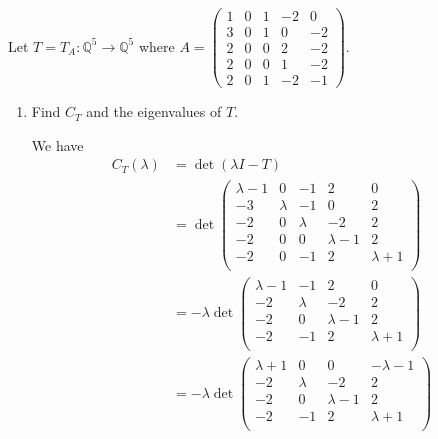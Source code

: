 \documentclass{eh-homework}
\begin{document}
    \begin{question}{2}
    Let $T = T_A : \mathbb{Q}^5 \to \mathbb{Q}^5$ where $A = \begin{pmatrix}
    1 & 0 & 1 & -2 & 0 \\
    3 & 0 & 1 & 0 & -2 \\
    2 & 0 & 0 & 2 & -2 \\
    2 & 0 & 0 & 1 & -2 \\
    2 & 0 & 1 & -2 & -1
    \end{pmatrix}$.
    
    \begin{enumerate}[label=(\alph*)]
        \item Find $C_T$ and the eigenvalues of $T$.
        
        We have
        \begin{align*}
            C_T(\lambda) &= \det (\lambda I - T) \\
            &= \det \begin{pmatrix}
                \lambda - 1 & 0 & -1 & 2 &  0 \\
                -3 & \lambda & -1 & 0 &  2 \\
                -2 & 0 & \lambda & -2 &  2 \\
                -2 & 0 & 0 & \lambda - 1 &  2 \\
                -2 & 0 & -1 & 2 &  \lambda + 1 \\
            \end{pmatrix} \\
            &= -\lambda \det \begin{pmatrix}
                \lambda - 1 & -1 & 2 &  0 \\
                -2 & \lambda & -2 &  2 \\
                -2 & 0 & \lambda - 1 &  2 \\
                -2 & -1 & 2 &  \lambda + 1 \\
            \end{pmatrix} \\
            &= -\lambda \det \begin{pmatrix}
                \lambda + 1 & 0 & 0 &  -\lambda - 1 \\
                -2 & \lambda & -2 &  2 \\
                -2 & 0 & \lambda - 1 &  2 \\
                -2 & -1 & 2 &  \lambda + 1 \\
            \end{pmatrix} \\

\end{align*}
\end{enumerate}
\end{question}
\end{document}
